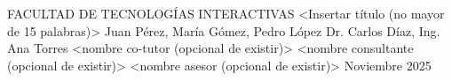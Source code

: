 \portadaUCI
  {FACULTAD DE TECNOLOGÍAS INTERACTIVAS}
  {<Insertar título (no mayor de 15 palabras)>}
  {Juan Pérez, María Gómez, Pedro López}
  {Dr. Carlos Díaz, Ing. Ana Torres}
  {<nombre co-tutor (opcional de existir)>}     %
  {<nombre consultante (opcional de existir)>}  %
  {<nombre asesor (opcional de existir)>}       %
  {Noviembre}
  {2025}
